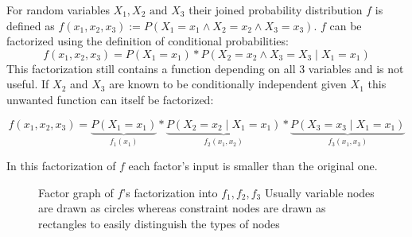 \begin{example}
For random variables $X_1, X_2 \text{ and } X_3$ their joined probability distribution $f$ is defined as $f(x_1, x_2, x_3) := P(X_1 = x_1 \land X_2  = x_2 \land X_3 = x_3)$. 
$f$ can be factorized using the definition of conditional probabilities: $$f(x_1, x_2, x_3) = P(X_1 = x_1) * P(X_2 = x_2 \land X_3 = X_3 \; | \; X_1 = x_1)$$
This factorization still contains a function depending on all $3$ variables and is not useful. If $X_2$ and $X_3$ are known to be conditionally independent given $X_1$ this unwanted function can itself be factorized:

$$f(x_1, x_2, x_3) = \underbrace{P(X_1 = x_1)}_{f_1(x_1)} * \underbrace{P(X_2 = x_2 \; | \; X_1 = x_1)}_{f_2(x_1, x_2)} * \underbrace{P(X_3 = x_3 \; | \; X_1 = x_1)}_{f_3(x_1, x_3)}$$

In this factorization of $f$ each factor's input is smaller than the original one.

\begin{figure}
\centering

\caption{Factor graph of $f$'s factorization into $f_1, f_2, f_3$ \newline Usually variable nodes are drawn as circles whereas constraint nodes are drawn as rectangles to easily distinguish the types of nodes}

\end{figure}



\end{example}
%

